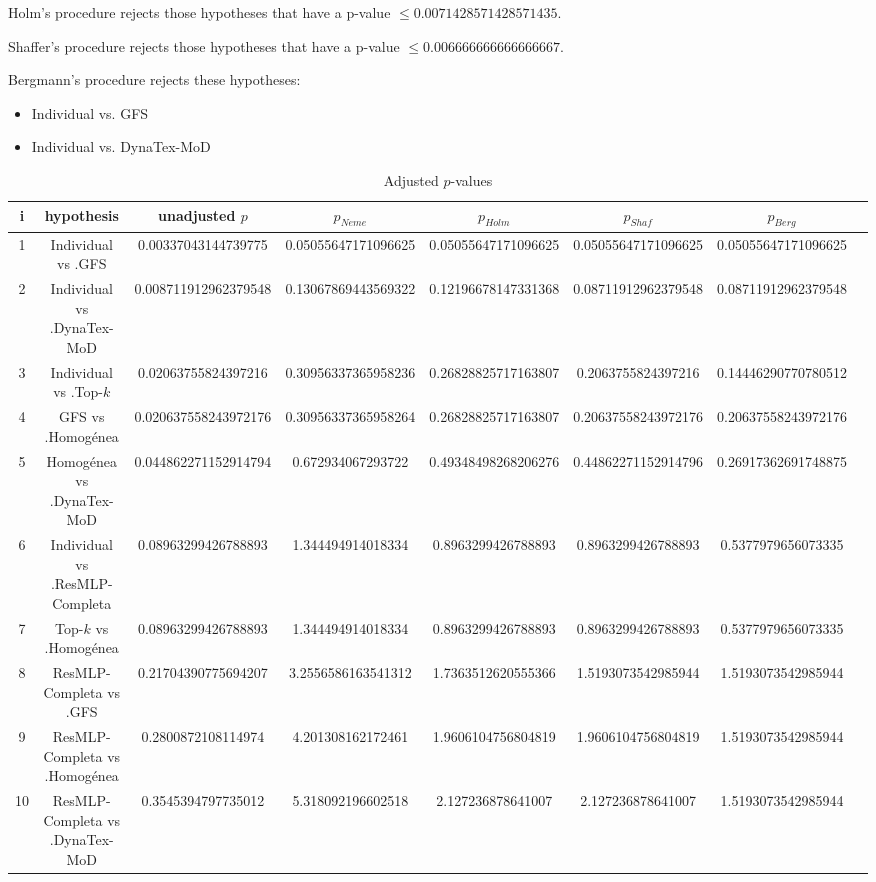 \documentclass[a4paper,10pt]{article}
\begin{document}
\begin{landscape}
Holm's procedure rejects those hypotheses that have a p-value $\le0.0071428571428571435$.


Shaffer's procedure rejects those hypotheses that have a p-value $\le0.006666666666666667$.


Bergmann's procedure rejects these hypotheses:


\begin{itemize}


\item Individual vs. GFS
\item Individual vs. DynaTex-MoD
\end{itemize}


\begin{table}[!htp]
\centering\tiny
\caption{Adjusted $p$-values}
\begin{tabular}{cccccccc}
i&hypothesis&unadjusted $p$&$p_{Neme}$&$p_{Holm}$&$p_{Shaf}$&$p_{Berg}$\\
\hline
1&Individual vs .GFS&0.00337043144739775&0.05055647171096625&0.05055647171096625&0.05055647171096625&0.05055647171096625\\
2&Individual vs .DynaTex-MoD&0.008711912962379548&0.13067869443569322&0.12196678147331368&0.08711912962379548&0.08711912962379548\\
3&Individual vs .Top-$k$&0.02063755824397216&0.30956337365958236&0.26828825717163807&0.2063755824397216&0.14446290770780512\\
4&GFS vs .Homogénea&0.020637558243972176&0.30956337365958264&0.26828825717163807&0.20637558243972176&0.20637558243972176\\
5&Homogénea vs .DynaTex-MoD&0.044862271152914794&0.672934067293722&0.49348498268206276&0.44862271152914796&0.26917362691748875\\
6&Individual vs .ResMLP-Completa&0.08963299426788893&1.344494914018334&0.8963299426788893&0.8963299426788893&0.5377979656073335\\
7&Top-$k$ vs .Homogénea&0.08963299426788893&1.344494914018334&0.8963299426788893&0.8963299426788893&0.5377979656073335\\
8&ResMLP-Completa vs .GFS&0.21704390775694207&3.2556586163541312&1.7363512620555366&1.5193073542985944&1.5193073542985944\\
9&ResMLP-Completa vs .Homogénea&0.2800872108114974&4.201308162172461&1.9606104756804819&1.9606104756804819&1.5193073542985944\\
10&ResMLP-Completa vs .DynaTex-MoD&0.3545394797735012&5.318092196602518&2.127236878641007&2.127236878641007&1.5193073542985944\\

\end{tabular}
\end{table}
\end{landscape}
\end{document}
